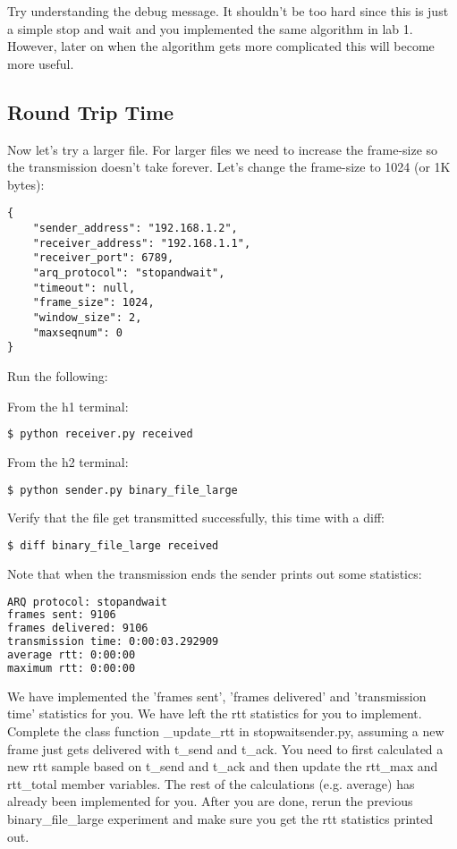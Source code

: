 \documentclass[11pt]{article}
\begin{document}
Try understanding the debug message. It shouldn't be too hard since this is just a simple stop and wait and you implemented the same algorithm in lab 1. However, later on when the algorithm gets more complicated this will become more useful.

\subsection{Round Trip Time}
Now let's try a larger file. For larger files we need to increase the frame-size so the transmission doesn't take forever. Let's change the frame-size to 1024 (or 1K bytes):
\begin{lstlisting}[caption={Configuration For Large File}]
{
    "sender_address": "192.168.1.2",
    "receiver_address": "192.168.1.1",
    "receiver_port": 6789,
    "arq_protocol": "stopandwait",
    "timeout": null,
    "frame_size": 1024,
    "window_size": 2,
    "maxseqnum": 0
}
\end{lstlisting}
Run the following:

From the h1 terminal:
\begin{lstlisting}[language=bash]
$ python receiver.py received
\end{lstlisting}
From the h2 terminal:
\begin{lstlisting}[language=bash]
$ python sender.py binary_file_large
\end{lstlisting}


Verify that the file get transmitted successfully, this time with a diff:
\begin{lstlisting}[language=bash]
$ diff binary_file_large received
\end{lstlisting}

Note that when the transmission ends the sender prints out some statistics:

\begin{lstlisting}[language=bash]
ARQ protocol: stopandwait
frames sent: 9106
frames delivered: 9106
transmission time: 0:00:03.292909
average rtt: 0:00:00
maximum rtt: 0:00:00
\end{lstlisting}

We have implemented the 'frames sent', 'frames delivered' and 'transmission time' statistics for you. We have left the rtt statistics for you to implement. Complete the class function \_update\_rtt in stopwaitsender.py, assuming a new frame just gets delivered with t\_send and t\_ack. You need to first calculated a new rtt sample based on t\_send and t\_ack and then update the rtt\_max and rtt\_total member variables. The rest of the calculations (e.g. average) has already been implemented for you. After you are done, rerun the previous binary\_file\_large experiment and make sure you get the rtt statistics printed out.
\end{document}
